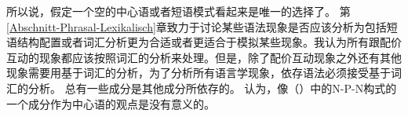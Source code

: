 所以说，假定一个空的中心语或者短语模式看起来是唯一的选择了。
%
第\ref{Abschnitt-Phrasal-Lexikalisch}章致力于讨论某些语法现象是否应该分析为包括短语结构配置或者词汇分析更为合适或者更适合于模拟某些现象。我认为所有跟配价互动的现象都应该按照词汇的分析来处理。但是，除了配价互动现象之外还有其他现象需要用基于词汇的分析，为了分析所有语言学现象，依存语法必须接受基于词汇的分析。
总有一些成分是其他成分所依存的。 \citet{Jackendoff2008a}认为，像（）中的N-P-N构式的一个成分作为中心语的观点是没有意义的。
